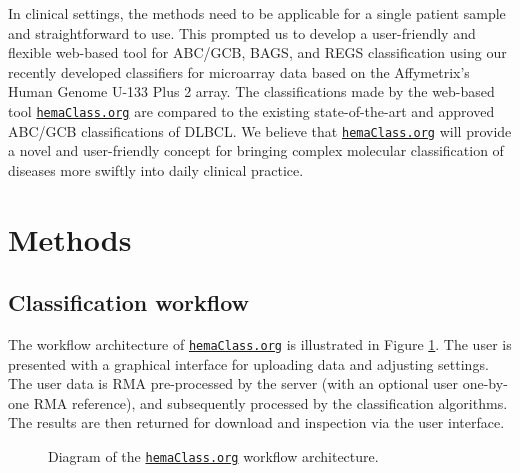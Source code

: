 \documentclass[10pt,letterpaper]{article}
\newcommand{\hemaClass}{\href{http://hemaClass.org}{\texttt{hemaClass.org}}}
\begin{document}
In clinical settings, the methods need to be applicable for a single patient sample and straightforward to use.
This prompted us to develop a user-friendly and flexible web-based tool for ABC/GCB, BAGS, and REGS classification using our recently developed classifiers for microarray data based on the Affymetrix's Human Genome U-133 Plus 2 array.
The classifications made by the web-based tool \hemaClass{} are compared to the existing state-of-the-art and approved ABC/GCB classifications of DLBCL.
We believe that \hemaClass{} will provide a novel and user-friendly concept for bringing complex molecular classification of diseases more swiftly into daily clinical practice.

 
\section*{Methods}
\subsection*{Classification workflow}
The workflow architecture of \hemaClass{} is illustrated in Figure \mbox{\ref{fig:webtooldiagram}}. The user is presented with a graphical interface for uploading data and adjusting settings. The user data is RMA pre-processed by the server (with an optional user one-by-one RMA reference), and subsequently processed by the classification algorithms. The results are then returned for download and inspection via the user interface.

\begin{figure}
	\begin{center}
	\end{center}
	\caption{Diagram of the \hemaClass{} workflow architecture.}
	\label{fig:webtooldiagram}
\end{figure}
\end{document}
